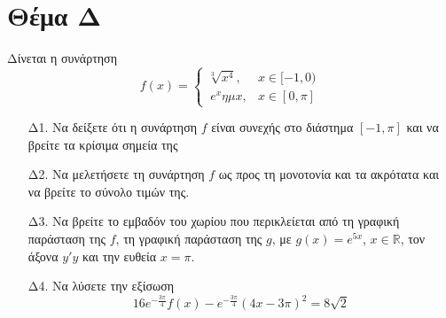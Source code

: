 \documentclass[12pt]{article}
\begin{document}
  \section*{Θέμα Δ}
  Δίνεται η συνάρτηση \[ f(x)=\begin{cases} \sqrt[3]{x^4}, & x\in[-1,0) \\\ e^xημx, & x\in[0,\pi]\end{cases} \]
  \begin{enumerate}
    \item [Δ1.] Να δείξετε ότι η συνάρτηση $f$ είναι συνεχής στο διάστημα $[-1,\pi]$ και να βρείτε τα κρίσιμα σημεία της
    \item [Δ2.] Να μελετήσετε τη συνάρτηση $f$ ως προς τη μονοτονία και τα ακρότατα και να βρείτε το σύνολο τιμών της.
    \item [Δ3.] Να βρείτε το εμβαδόν του χωρίου που περικλείεται από τη γραφική παράσταση της $f$, τη γραφική παράσταση της $g$, με $g(x)=e^{5x}$, $x\in\mathbb{R}$, τον άξονα $y'y$ και την ευθεία $x=\pi$.
    \item [Δ4.] Να λύσετε την εξίσωση \[ 16e^{-\frac{3\pi}{4}}f(x)-e^{-\frac{3\pi}{4}}\left(4x-3\pi\right)^2=8\sqrt{2} \]
  \end{enumerate}
\end{document}
